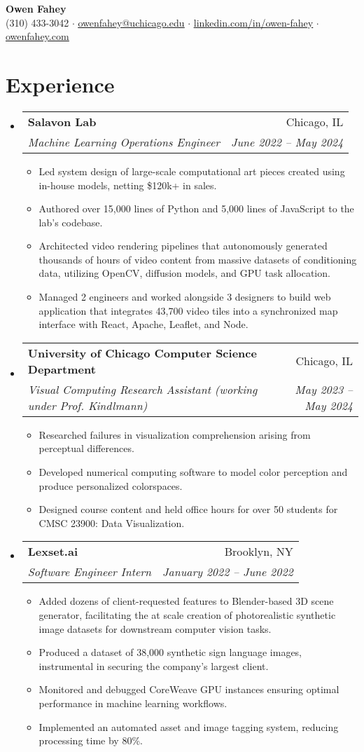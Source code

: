 \documentclass[letterpaper,11pt]{article}
\makeatletter
\newcommand{\resumeItem}[1]{
  \item\small{
    {#1 \vspace{-2pt}}
  }
}
\newcommand{\resumeSubheading}[4]{
  \vspace{-2pt}\item
    \begin{tabular*}{0.97\textwidth}[t]{l@{\extracolsep{\fill}}r}
      \textbf{#1} & #2 \\
      \textit{\small#3} & \textit{\small #4} \\
    \end{tabular*}\vspace{-7pt}
}
\newcommand{\resumeSubHeadingListStart}{\begin{itemize}[leftmargin=0.125in, label={}]}
\newcommand{\resumeSubHeadingListEnd}{\end{itemize}}
\newcommand{\resumeItemListStart}{\begin{itemize}[leftmargin=0.185in]
}
\newcommand{\resumeItemListEnd}{\end{itemize}\vspace{-5pt}}
\makeatother
\begin{document}
\begin{center}
  \textbf{\Huge 
Owen Fahey} \\
  \small (310) 433-3042 $\cdot$
  \href{mailto:owenfahey@uchicago.edu}{\underline{owenfahey@uchicago.edu}} $\cdot$
  \href{https://www.linkedin.com/in/owen-fahey}{\underline{linkedin.com/in/owen-fahey}} $\cdot$
  \href{https://owenfahey.com}{\underline{owenfahey.com}}
\end{center}

  
\section{Experience}
  \resumeSubHeadingListStart
    \resumeSubheading
      {Salavon Lab}
      {Chicago, IL}
      {Machine Learning Operations Engineer}
      {June 2022 -- May 2024}
      \resumeItemListStart
        \resumeItem{Led system design of large-scale computational art pieces created using in-house models, netting \$120k+ in sales.}
        \resumeItem{Authored over 15,000 lines of Python and 5,000 lines of JavaScript to the lab's codebase.}
        \resumeItem{Architected video rendering pipelines that autonomously generated thousands of hours of video content from massive datasets of conditioning data, utilizing OpenCV, diffusion models, and GPU task allocation.}
        \resumeItem{Managed 2 engineers and worked alongside 3 designers to build web application that integrates 43,700 video tiles into a synchronized map interface with React, Apache, Leaflet, and Node.}
        
      \resumeItemListEnd
    \resumeSubheading
      {University of Chicago Computer Science Department}
      {Chicago, IL}
      {Visual Computing Research Assistant (working under Prof. Kindlmann)}
      {May 2023 -- May 2024}
      \resumeItemListStart
        \resumeItem{Researched failures in visualization comprehension arising from perceptual differences.}
        \resumeItem{Developed numerical computing software to model color perception and produce personalized colorspaces.}
        \resumeItem{Designed course content and held office hours for over 50 students for CMSC 23900: Data Visualization.}
      \resumeItemListEnd
    \resumeSubheading
      {Lexset.ai}
      {Brooklyn, NY}
      {Software Engineer Intern}
      {January 2022 -- June 2022}
      \resumeItemListStart
        \resumeItem{Added dozens of client-requested features to Blender-based 3D scene generator, facilitating the at scale creation of \nolinebreak photorealistic synthetic image datasets for downstream computer vision tasks.} \nolinebreak
        \resumeItem{Produced a dataset of 38,000 synthetic sign language images, instrumental in securing the company's largest client.}
        \resumeItem{Monitored and debugged CoreWeave GPU instances ensuring optimal performance in machine learning workflows. }
        \resumeItem{Implemented an automated asset and image tagging system, reducing processing time by 80\%.}
      \resumeItemListEnd
  \resumeSubHeadingListEnd
\end{document}
